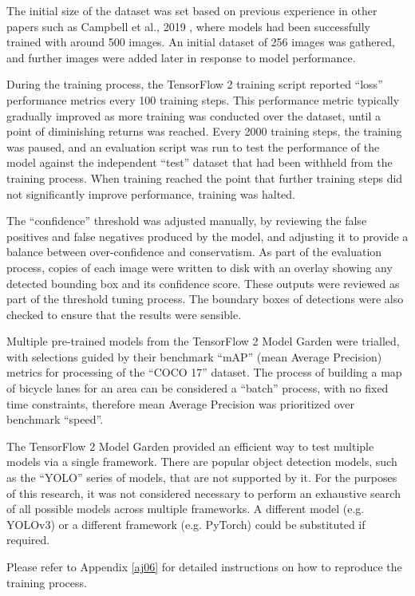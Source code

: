 \documentclass[11pt,twoside]{report}
\begin{document}
The initial size of the dataset was set based on previous experience in other papers such as Campbell et al., 2019 \cite{CAMPBELL2019101350}, where models had been successfully trained with around 500 images.  An initial dataset of 256 images was gathered, and further images were added later in response to model performance.

During the training process, the TensorFlow 2 training script reported ``loss'' performance metrics every 100 training steps.  This performance metric typically gradually improved as more training was conducted over the dataset, until a point of diminishing returns was reached.  Every 2000 training steps, the training was paused, and an evaluation script was run to test the performance of the model against the independent ``test'' dataset that had been withheld from the training process.  When training reached the point that further training steps did not significantly improve performance, training was halted.

The ``confidence'' threshold was adjusted manually, by reviewing the false positives and false negatives produced by the model, and adjusting it to provide a balance between over-confidence and conservatism.  As part of the evaluation process, copies of each image were written to disk with an overlay showing any detected bounding box and its confidence score.  These outputs were reviewed as part of the threshold tuning process.  The boundary boxes of detections were also checked to ensure that the results were sensible.

Multiple pre-trained models from the TensorFlow 2 Model Garden were trialled, with selections guided by their benchmark ``mAP'' (mean Average Precision) metrics for processing of the ``COCO 17'' dataset.  The process of building a map of bicycle lanes for an area can be considered a ``batch'' process, with no fixed time constraints, therefore mean Average Precision was prioritized over benchmark ``speed''.

The TensorFlow 2 Model Garden provided an efficient way to test multiple models via a single framework.  There are popular object detection models, such as the ``YOLO'' series of models, that are not supported by it.  For the purposes of this research, it was not considered necessary to perform an exhaustive search of all possible models across multiple frameworks.  A different model (e.g. YOLOv3) or a different framework (e.g. PyTorch) could be substituted if required.

Please refer to Appendix \ref{aj06} for detailed instructions on how to reproduce the training process.
\end{document}
